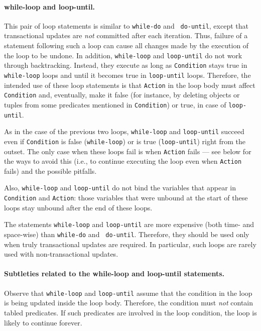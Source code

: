 \documentclass[11pt]{article}
\newcommand{\bs}{\textbackslash}
\begin{document}
\paragraph{while-loop and loop-until.}
\index{\bs{}until}
This pair of loop statements is similar to {\tt while-do} and {\tt
  do-until}, except that transactional updates are \emph{not} committed
after each iteration. Thus, failure of a statement following such a loop
can cause all changes made by the execution of the loop to be undone.  In
addition, {\tt while-loop} and {\tt loop-until} do not work through
backtracking. Instead, they execute as long as {\tt Condition} stays true
in \texttt{while-loop} loops and until it becomes true in
\texttt{loop-until} loops.  
Therefore, the intended use of these loop statements is that {\tt Action}
in the loop body must affect {\tt Condition} and, eventually, make it false
(for instance, by deleting objects or tuples from some predicates mentioned
in {\tt Condition}) or true, in case of \texttt{loop-until}. 
  
As in the case of the previous two loops, {\tt while-loop} and
{\tt loop-until} succeed even if {\tt Condition} is false (\texttt{while-loop})
or is true (\texttt{loop-until})
right from the
outset. The only case when these loops fail is when {\tt Action} fails ---
see below for the ways to avoid this (i.e.,
to continue executing the loop even when {\tt Action} fails) and the
possible pitfalls.

Also, {\tt while-loop} and {\tt loop-until} do not bind the variables that
appear in \texttt{Condition} and \texttt{Action}: those variables that were
unbound at the start of these loops stay unbound after the end of these
loops.


The statements {\tt while-loop} and {\tt loop-until} are more
expensive (both time- and space-wise) than {\tt while-do} and {\tt
  do-until}. Therefore, they should be used only when truly transactional
updates are required. In particular, such loops are rarely used with
non-transactional updates.

\paragraph{Subtleties related to the while-loop and loop-until statements.}
Observe that {\tt while-loop} and {\tt loop-until} assume that the
condition in the loop is being updated inside the loop body.  Therefore,
the condition must \emph{not} contain tabled predicates.  If such
predicates are involved in the loop condition, the loop is likely to
continue forever.
\end{document}

